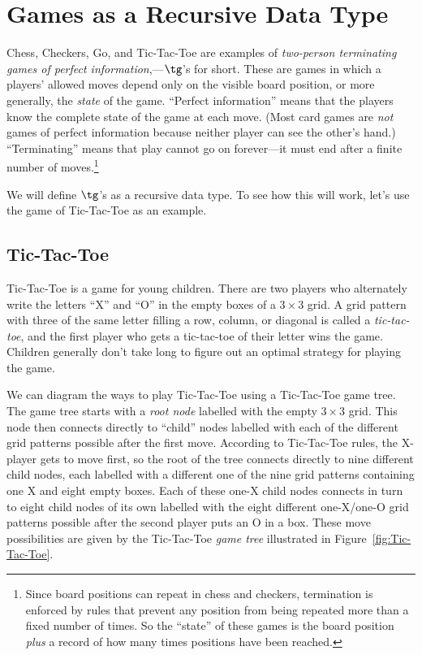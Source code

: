 
\section{Games as a Recursive Data Type}

Chess, Checkers, Go, and Tic-Tac-Toe are examples of \emph{two-person
  terminating games of perfect information},---$\tg$'s for short.
These are games in which a players' allowed moves depend only on the
visible board position, or more generally, the \emph{state} of the
game.  ``Perfect information'' means that the players know the
complete state of the game at each move.  (Most card games are
\emph{not} games of perfect information because neither player can see
the other's hand.)  ``Terminating'' means that play cannot go on
forever---it must end after a finite number of moves.\footnote{Since
  board positions can repeat in chess and checkers, termination is
  enforced by rules that prevent any position from being repeated more
  than a fixed number of times.  So the ``state'' of these games is
  the board position \emph{plus} a record of how many times positions
  have been reached.}

We will define $\tg$'s \iffalse in a straightforward way tagged\fi as a 
recursive data type.  To see how this will work, let's use the game of
Tic-Tac-Toe as an example.

\subsection{Tic-Tac-Toe}
Tic-Tac-Toe is a game for young children.  There are two players who
alternately write the letters ``X'' and ``O'' in the empty boxes of a
$3 \times 3$ grid.  A grid pattern with three of the same letter
filling a row, column, or diagonal is called a \emph{tic-tac-toe}, and
the first player who gets a tic-tac-toe of their letter wins the game.
Children generally don't take long to figure out an optimal strategy
for playing the game.

We can diagram the ways to play Tic-Tac-Toe using a Tic-Tac-Toe game
tree.  The game tree starts with a \emph{root node} labelled with the
empty $3 \times 3$ grid.  This node then connects directly to
``child'' nodes labelled with each of the different grid patterns
possible after the first move.  According to Tic-Tac-Toe rules, the
X-player gets to move first, so the root of the tree connects directly
to nine different child nodes, each labelled with a different one of
the nine grid patterns containing one X and eight empty boxes.  Each
of these one-X child nodes connects in turn to eight child nodes of
its own labelled with the eight different one-X/one-O grid
patterns possible after the second player puts an O in a box.  These
move possibilities are given by the Tic-Tac-Toe \emph{game tree}
illustrated in Figure~\ref{fig:Tic-Tac-Toe}.

